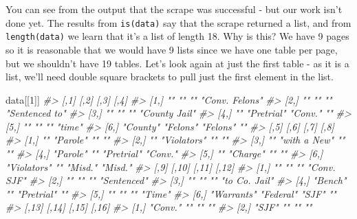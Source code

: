 \documentclass[
  12pt,
  openany]{book}
\newenvironment{Shaded}{\begin{snugshade}}{\end{snugshade}}
\newcommand{\CommentTok}[1]{\textcolor[rgb]{0.37,0.37,0.37}{\textit{#1}}}
\newcommand{\DecValTok}[1]{\textcolor[rgb]{0.06,0.06,0.06}{#1}}
\newcommand{\NormalTok}[1]{#1}
\begin{document}
You can see from the output that the scrape was successful - but our work isn't done yet. The results from \texttt{is(data)} say that the scrape returned a list, and from \texttt{length(data)} we learn that it's a list of length 18. Why is this? We have 9 pages so it is reasonable that we would have 9 lists since we have one table per page, but we shouldn't have 19 tables. Let's look again at just the first table - as it is a list, we'll need double square brackets to pull just the first element in the list.

\begin{Shaded}
\begin{Highlighting}[]
\NormalTok{data[[}\DecValTok{1}\NormalTok{]]}
\CommentTok{\#\textgreater{}      [,1]     [,2]       [,3]     [,4]          }
\CommentTok{\#\textgreater{} [1,] ""       ""         ""       "Conv. Felons"}
\CommentTok{\#\textgreater{} [2,] ""       ""         ""       "Sentenced to"}
\CommentTok{\#\textgreater{} [3,] ""       ""         ""       "County Jail" }
\CommentTok{\#\textgreater{} [4,] ""       "Pretrial" "Conv."  ""            }
\CommentTok{\#\textgreater{} [5,] ""       ""         ""       "time"        }
\CommentTok{\#\textgreater{} [6,] "County" "Felons"   "Felons" ""            }
\CommentTok{\#\textgreater{}      [,5]        [,6]         [,7]       [,8]   }
\CommentTok{\#\textgreater{} [1,] ""          "Parole"     ""         ""     }
\CommentTok{\#\textgreater{} [2,] ""          "Violators"  ""         ""     }
\CommentTok{\#\textgreater{} [3,] ""          "with a New" ""         ""     }
\CommentTok{\#\textgreater{} [4,] "Parole"    ""           "Pretrial" "Conv."}
\CommentTok{\#\textgreater{} [5,] ""          "Charge"     ""         ""     }
\CommentTok{\#\textgreater{} [6,] "Violators" ""           "Misd."    "Misd."}
\CommentTok{\#\textgreater{}      [,9]       [,10]     [,11]      [,12]        }
\CommentTok{\#\textgreater{} [1,] ""         ""        ""         "Conv. SJF"  }
\CommentTok{\#\textgreater{} [2,] ""         ""        ""         "Sentenced"  }
\CommentTok{\#\textgreater{} [3,] ""         ""        ""         "to Co. Jail"}
\CommentTok{\#\textgreater{} [4,] "Bench"    ""        "Pretrial" ""           }
\CommentTok{\#\textgreater{} [5,] ""         ""        ""         "Time"       }
\CommentTok{\#\textgreater{} [6,] "Warrants" "Federal" "SJF"      ""           }
\CommentTok{\#\textgreater{}      [,13]           [,14]    [,15]   [,16]     }
\CommentTok{\#\textgreater{} [1,] "Conv."         ""       ""      ""        }
\CommentTok{\#\textgreater{} [2,] "SJF"           ""       ""      ""        }

\end{Highlighting}
\end{Shaded}
\end{document}
